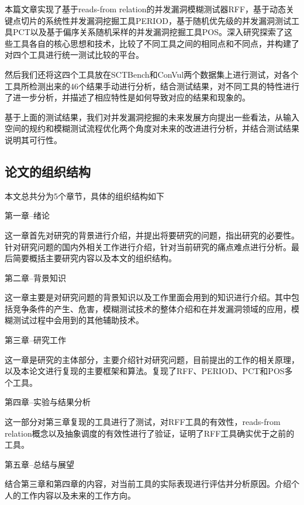本篇文章实现了基于reads-from relation的并发漏洞模糊测试器RFF，基于动态关键点切片的系统性并发漏洞挖掘工具PERIOD，基于随机优先级的并发漏洞测试工具PCT以及基于偏序关系随机采样的并发漏洞挖掘工具POS。深入研究探索了这些工具各自的核心思想和技术，比较了不同工具之间的相同点和不同点，并构建了对四个工具进行统一测试比较的平台。

然后我们还将这四个工具放在SCTBench和ConVul两个数据集上进行测试，对各个工具所检测出来的46个结果手动进行分析，结合测试结果，对不同工具的特性进行了进一步分析，并描述了相应特性是如何导致对应的结果和现象的。

基于上面的测试结果，我们对并发漏洞挖掘的未来发展方向提出一些看法，从输入空间的规约和模糊测试流程优化两个角度对未来的改进进行分析，并结合测试结果说明其可行性。

\subsection{论文的组织结构}

本文总共分为5个章节，具体的组织结构如下

第一章--绪论\par
这一章首先对研究的背景进行介绍，并提出将要研究的问题，指出研究的必要性。针对研究问题的国内外相关工作进行介绍，针对当前研究的痛点难点进行分析。最后简要概括主要研究内容以及本文的组织结构。\par\par
第二章--背景知识\par
这一章主要是对研究问题的背景知识以及工作里面会用到的知识进行介绍。其中包括竞争条件的产生、危害，模糊测试技术的整体介绍和在并发漏洞领域的应用，模糊测试过程中会用到的其他辅助技术。\par\par
第三章--研究工作\par
这一章是研究的主体部分，主要介绍针对研究问题，目前提出的工作的相关原理，以及本论文进行复现的主要框架和算法。复现了RFF、PERIOD、PCT和POS多个工具。\par\par
第四章--实验与结果分析\par
这一部分对第三章复现的工具进行了测试，对RFF工具的有效性，reads-from relation概念以及抽象调度的有效性进行了验证，证明了RFF工具确实优于之前的工具。\par\par
第五章--总结与展望\par
结合第三章和第四章的内容，对当前工具的实际表现进行评估并分析原因。介绍个人的工作内容以及未来的工作方向。

\clearpage{}

